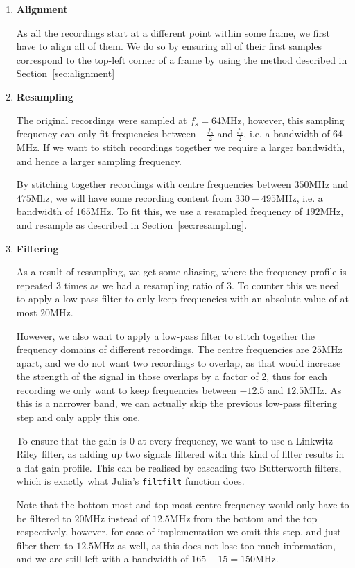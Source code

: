 \documentclass{article}
\newcommand{\sectionref}[1]{\hyperref[sec:#1]{Section~\ref*{sec:#1}}}
\begin{document}
\begin{enumerate}

    \item \textbf{Alignment} \par 
    As all the recordings start at a different point within some frame, we first have to align all of them. We do so by ensuring all of their first samples correspond to the top-left corner of a frame by using the method described in \sectionref{alignment}
    
    \item \textbf{Resampling} \par 
    The original recordings were sampled at $f_s = 64$MHz, however, this sampling frequency can only fit frequencies between $-\frac{f_s}{2}$ and $\frac{f_s}{2}$, i.e. a bandwidth of $64$MHz. If we want to stitch recordings together we require a larger bandwidth, and hence a larger sampling frequency. 

    By stitching together recordings with centre frequencies between $350$MHz and $475$Mhz, we will have some recording content from $330-495$MHz, i.e. a bandwidth of $165$MHz. To fit this, we use a resampled frequency of $192$MHz, and resample as described in \sectionref{resampling}.

    \item \textbf{Filtering} \par 
    As a result of resampling, we get some aliasing, where the frequency profile is repeated 3 times as we had a resampling ratio of 3. To counter this we need to apply a low-pass filter to only keep frequencies with an absolute value of at most $20$MHz.

    However, we also want to apply a low-pass filter to stitch together the frequency domains of different recordings. The centre frequencies are $25$MHz apart, and we do not want two recordings to overlap, as that would increase the strength of the signal in those overlaps by a factor of 2, thus for each recording we only want to keep frequencies between $-12.5$ and $12.5$MHz. As this is a narrower band, we can actually skip the previous low-pass filtering step and only apply this one.

    To ensure that the gain is $0$ at every frequency, we want to use a Linkwitz-Riley filter, as adding up two signals filtered with this kind of filter results in a flat gain profile. This can be realised by cascading two Butterworth filters, which is exactly what Julia's \texttt{filtfilt} function does.

    Note that the bottom-most and top-most centre frequency would only have to be filtered to $20$MHz instead of $12.5$MHz from the bottom and the top respectively, however, for ease of implementation we omit this step, and just filter them to $12.5$MHz as well, as this does not lose too much information, and we are still left with a bandwidth of $165 - 15 = 150$MHz.


\end{enumerate}
\end{document}
